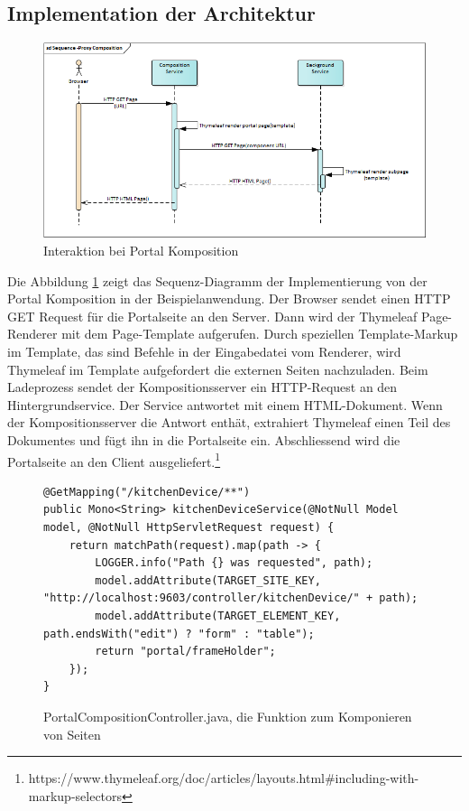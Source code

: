 \subsection{Implementation der Architektur}

\begin{figure}
    \centering
    \includegraphics[width=\textwidth]{sections/methology/assets/SequencePortalComposition}
    \caption{Interaktion bei Portal Komposition}
    \label{fig:sections:methology:portalComposition:Sequence}
\end{figure}

Die Abbildung  \ref{fig:sections:methology:portalComposition:Sequence} zeigt das Sequenz-Diagramm der Implementierung von der Portal Komposition in der Beispielanwendung. Der Browser sendet einen HTTP GET Request für die Portalseite an den Server. Dann wird der Thymeleaf Page-Renderer mit dem Page-Template aufgerufen. Durch speziellen Template-Markup im Template, das sind Befehle in der Eingabedatei vom Renderer, wird Thymeleaf im Template aufgefordert die externen Seiten nachzuladen. Beim Ladeprozess sendet der Kompositionsserver ein HTTP-Request an den Hintergrundservice. Der Service antwortet mit einem HTML-Dokument. Wenn der Kompositionsserver die Antwort enthät, extrahiert Thymeleaf einen Teil des Dokumentes und fügt ihn in die Portalseite ein. Abschliessend wird die Portalseite an den Client ausgeliefert.\footnote{https://www.thymeleaf.org/doc/articles/layouts.html\#including-with-markup-selectors}

\begin{figure}
    \centering
\begin{lstlisting}
@GetMapping("/kitchenDevice/**")
public Mono<String> kitchenDeviceService(@NotNull Model model, @NotNull HttpServletRequest request) {
    return matchPath(request).map(path -> {
        LOGGER.info("Path {} was requested", path);
        model.addAttribute(TARGET_SITE_KEY, "http://localhost:9603/controller/kitchenDevice/" + path);
        model.addAttribute(TARGET_ELEMENT_KEY, path.endsWith("edit") ? "form" : "table");
        return "portal/frameHolder";
    });
}
\end{lstlisting}
    \caption{PortalCompositionController.java, die Funktion zum Komponieren von Seiten}
    \label{fig:portalComposition:GETComposition}
\end{figure}

